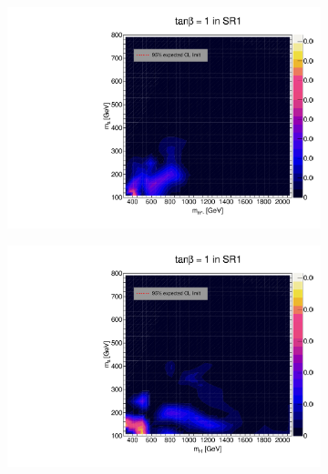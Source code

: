 \documentclass[12pt, a4paper]{book}
\begin{document}
\begin{figure}[!ht]
	\centering
	\begin{subfigure}[b]{0.49\textwidth}
      \centering
      \includegraphics[width=1\textwidth]{Limits/Model_independent/50-100/2HDM/2HDM_ee_tb1.pdf}
   \end{subfigure}
   \hfill
   \begin{subfigure}[b]{0.49\textwidth}
      \centering
      \includegraphics[width=1\textwidth]{Limits/Model_independent/50-100/2HDM/2HDM_uu_tb1.pdf}
   \end{subfigure}
   \hfill
   \begin{subfigure}[b]{0.49\textwidth}
      \centering

\end{subfigure}
\end{figure}
\end{document}
